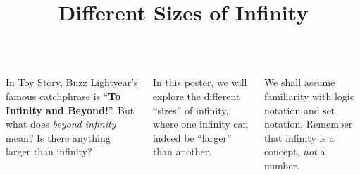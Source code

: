 \documentclass[17pt, a2paper, portrait]{tikzposter}
\title{Different Sizes of Infinity}
\author{}
\institute{}
\begin{document}
\maketitle

\begin{columns}
{
In Toy Story, Buzz Lightyear's famous catchphrase is ``\textbf{To Infinity and Beyond!}''. But what does \emph{beyond infinity} mean? Is there anything larger than infinity?

In this poster, we will explore the different ``sizes'' of infinity, where one infinity can indeed be ``larger'' than another.

We shall assume familiarity with logic notation and set notation. Remember that infinity is a concept, \emph{not} a number.
}

\end{columns}
\end{document}
